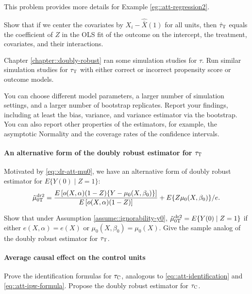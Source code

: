  This problem provides more details for Example \ref{eg::att-regression2}. 
 
Show that if we center the covariates by $X_i - \hat{\bar{X}}(1)$ for all units, then $\hat{\tau}_\textsc{T} $ equals the coefficient of $Z$ in the OLS fit of the outcome on the intercept, the treatment, covariates, and their interactions. 
 
 
 
Chapter \ref{chapter::doubly-robust} ran some simulation studies for $\tau$. Run similar simulation studies for $\tau_\textsc{T}$ with either correct or incorrect propensity score or outcome models. 

You can choose different model parameters, a larger number of simulation settings, and a larger number of bootstrap replicates. Report your findings, including at least the bias, variance, and variance estimator via the bootstrap. You can also report other properties of the estimators, for example, the asymptotic Normality and the coverage rates of the confidence intervals. 



\paragraph{An alternative form of the doubly robust estimator for $\tau_\textsc{T}$}\label{hw::alternative-dr2-robins-att}

Motivated by \eqref{eq::dr-att-mu0}, we have an alternative form of doubly robust estimator for $ E\{ Y(0) \mid Z=1 \}  $: 
$$
\tilde{\mu}_{0\textsc{T}}^\text{dr2} = 
\frac{  E\left[ o(X,\alpha)   (1-Z) \{ Y - \mu_0(X, \beta_0) \}  \right] }{  E\left[ o(X,\alpha)   (1-Z) \right] } 
  + E\{  Z  \mu_0(X, \beta_0) \} /e.
$$

Show that under Assumption \ref{assume::ignorability-y0}, $\tilde{\mu}_{0\textsc{T}}^\text{dr2}= E\{ Y(0) \mid Z=1 \}$ if either $e(X,\alpha)  = e(X)$ or $\mu_0(X, \beta_0) =  \mu_0(X)$.  Give the sample analog of the doubly robust estimator for $\tau_\textsc{T}$. 

 



 \paragraph{Average causal effect on the control units}\label{hw::formulas-atc}

Prove the identification formulas for $\tau_\textsc{C}$, analogous to \eqref{eq::att-identification} and \eqref{eq::att-ipw-formula}. Propose the doubly robust estimator for $\tau_\textsc{C}$. 


